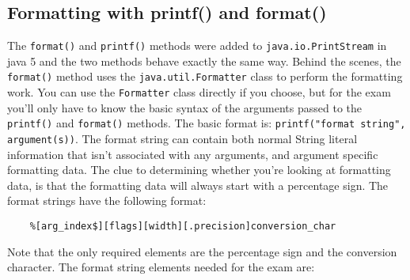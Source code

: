 \subsection{Formatting with printf() and format()}
The \verb#format()# and \verb#printf()# methods were added to 
\verb#java.io.PrintStream# in java 5 and the two methods behave exactly the 
same way. Behind the scenes, the \verb#format()# method uses the 
\verb#java.util.Formatter# class to perform the formatting work. You can use 
the \verb#Formatter# class directly if you choose, but for the exam you'll only 
have to know the basic syntax of the arguments passed to the \verb#printf()# 
and \verb#format()# methods. The basic format is:
\verb#printf("format string", argument(s))#. The format string can contain both 
normal String literal information that isn't associated with any arguments, and 
argument specific formatting data. The clue to determining whether you're 
looking at formatting data, is that the formatting data will always start with 
a percentage sign. The format strings have the following format:
\begin{verbatim}
    %[arg_index$][flags][width][.precision]conversion_char
\end{verbatim}
Note that the only required elements are the percentage sign and the conversion 
character. The format string elements needed for the exam are:
